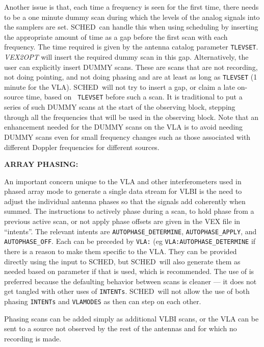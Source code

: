 \documentclass{report}
\newcommand{\sched}{{\sc SCHED}}
\newcommand{\schedb}{{\sc SCHED~}}
\begin{document}
Another issue is that, each time a frequency is seen for the first
time, there needs to be a one minute dummy scan during which the
levels of the analog signals into the samplers are set.  \schedb can
handle this when using  scheduling by
inserting the appropriate amount of time as a gap before the first
scan with each frequency.  The time required is given by the antenna
catalog parameter {\tt TLEVSET}.  {\sl VEX2OPT} will insert the
required dummy scan in this gap.  Alternatively, the user can
explicitly insert DUMMY scans.  These are scans that are not
recording, not doing pointing, and not doing phasing and are at least
as long as {\tt TLEVSET} (1 minute for the VLA).  \schedb will not try
to insert a gap, or claim a late on-source time, based on {\tt
TLEVSET} before such a scan.  It is traditional to put a series of
such DUMMY scans at the start of the observing block, stepping through
all the frequencies that will be used in the observing block.  Note
that an enhancement needed for the DUMMY scans on the VLA is to avoid
needing DUMMY scans even for small frequency changes such as those
associated with different Doppler frequencies for different sources.

{\bf ARRAY PHASING:}

An important concern unique to the VLA and other interferometers used
in phased array mode to generate a single data stream for VLBI is the
need to adjust the individual antenna phases so that the signals add
coherently when summed.  The instructions to actively phase during a
scan, to hold phase from a previous active scan, or not apply phase
offsets are given in the VEX file in ``intents''.  The relevant
intents are {\tt AUTOPHASE\_DETERMINE}, {\tt AUTOPHASE\_APPLY}, and
{\tt AUTOPHASE\_OFF}.  Each can be preceded by {\tt VLA:} (eg 
{\tt VLA:AUTOPHASE\_DETERMINE} if there is a reason to make them 
specific to the VLA.   They can be provided directly using the
 input to \sched, but \schedb will
also generate them as needed based on  parameter if that is used, which is recommended.
The use of  is preferred because
the defaulting behavior between scans is cleaner --- it does not get
tangled with other uses of {\tt INTENTs}.  \schedb will not allow the
use of both phasing {\tt INTENTs} and {\tt VLAMODES} as then can step
on each other.

Phasing scans can be added simply as additional VLBI scans, or the VLA
can be sent to a source not observed by the rest of the antennas and
for which no recording is made.
\end{document}
